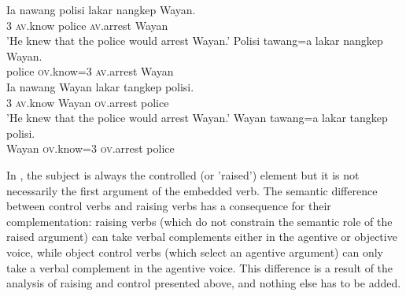 \documentclass[output=paper
	        ,collection
	        ,collectionchapter
 	        ,biblatex
                ,babelshorthands
                ,newtxmath
                ,draftmode
                ,colorlinks, citecolor=brown
]{langscibook}
\begin{document}
\begin{exe}
\ex \begin{xlist}
\ex 
\gll
Ia nawang polisi lakar nangkep Wayan. \\
3 \textsc{av}.know police \FUT{} \textsc{av}.arrest Wayan \\
\glt 'He knew that the police would arrest Wayan.' \label{av}
\ex
\label{rais-av} 
\gll Polisi tawang=a  lakar nangkep Wayan. \\
     police \textsc{ov}.know=3 \FUT{}   \textsc{av}.arrest Wayan\\

\ex
\gll Ia nawang Wayan lakar tangkep polisi. \\
     3 \textsc{av}.know Wayan \FUT{} \textsc{ov}.arrest police\\
\glt 'He knew that the police would arrest Wayan.' \label{ov}
\ex
\gll Wayan tawang=a lakar tangkep polisi. \\
     Wayan \textsc{ov}.know=3 \FUT{} \textsc{ov}.arrest police\\ \label{rais-ov}
\end{xlist}
\end{exe}


In , the subject is always the controlled (or 'raised') element but it is not necessarily the first argument of the embedded verb. The semantic difference between control verbs and raising verbs has a consequence for their complementation: raising verbs (which do not constrain the semantic role of the raised argument) can take verbal complements either in the agentive or objective voice, while object control verbs (which select an agentive argument) can only take a verbal complement in the agentive voice. This difference is a result of the analysis of raising and control presented above, and nothing else has to be added.
\end{document}
